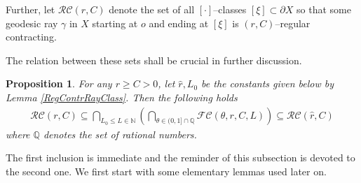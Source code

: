 \documentclass{amsart}
\newtheorem{prop}[thm]{Proposition}
\theoremstyle{definition}
\theoremstyle{remark}
\newcommand{\U}{ X}
\newcommand{\pU}{\partial{  X}}
\begin{document}
Further, let $\mathcal{RC}(r, C)$ denote the set of all $[\cdot]$--classes   $[\xi]\subset \pU$ so that some geodesic ray $\gamma$ in $\U$ starting at $o$ and ending at $[\xi]$  is $(r,C)$--regular contracting. 

The relation between these sets shall be crucial in further discussion. 
\begin{prop}\label{RCasCountableIntersection}
For any $r\ge C>0$, let $\hat r, L_0$ be the constants given below by Lemma \ref{RegContrRayClass}. Then the following holds
$$
\begin{aligned}\label{RCCountIntEQ}
\mathcal{RC}( r, C) \subseteq \bigcap_{L_0\le L\in \mathbb N}\left (\bigcap_{\theta\in (0,1]\cap \mathbb Q} \mathcal{FC}(\theta,r, C,L)\right)  \subseteq \mathcal{RC}(\hat r, C)   
\end{aligned}
$$
where $\mathbb Q$ denotes the set of rational numbers.
\end{prop}
The first inclusion is immediate and the reminder of this subsection is devoted to the second one. 
We first start with some elementary lemmas  used later on.
 


\end{document}
